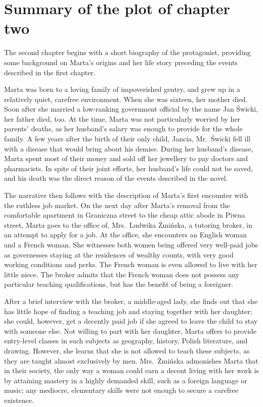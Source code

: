 \section{Summary of the plot of chapter two}

The second chapter begins with a short biography of the protagonist, providing some background on Marta's origins and her life story preceding the events described in the first chapter.

Marta was born to a loving family of impoverished gentry, and grew up in a relatively quiet, carefree environment.
When she was sixteen, her mother died.
Soon after she married a low-ranking government official by the name Jan Świcki, her father died, too.
At the time, Marta was not particularly worried by her parents' deaths, as her husband's salary was enough to provide for the whole family.
A few years after the birth of their only child, Jancia, Mr.\ Świcki fell ill with a disease that would bring about his demise.
During her husband's disease, Marta spent most of their money and sold off her jewellery to pay doctors and pharmacists.
In spite of their joint efforts, her husband's life could not be saved, and his death was the direct reason of the events described in the novel.

The narrative then follows with the description of Marta's first encounter with the ruthless job market.
On the next day after Marta's removal from the comfortable apartment in Graniczna street to the cheap attic abode in Piwna street, Marta goes to the office of, Mrs.\ Ludwika Żmińska, a tutoring broker, in an attempt to apply for a job.
At the office, she encounters an English woman and a French woman.
She witnesses both women being offered very well-paid jobs as governesses staying at the residences of wealthy counts, with very good working conditions and perks.
The French woman is even allowed to live with her little niece.
The broker admits that the French woman does not possess any particular teaching qualifications, but has the benefit of being a foreigner.

After a brief interview with the broker, a middle-aged lady, she finds out that she has little hope of finding a teaching job and staying together with her daughter; she could, however, get a decently paid job if she agreed to leave the child to stay with someone else.
Not willing to part with her daughter, Marta offers to provide entry-level classes in such subjects as geography, history, Polish literature, and drawing.
However, she learns that she is not allowed to teach these subjects, as they are taught almost exclusively by men.
Mrs.\ Żmińska admonishes Marta that in their society, the only way a woman could earn a decent living with her work is by attaining mastery in a highly demanded skill, such as a foreign language or music; any mediocre, elementary skills were not enough to secure a carefree existence.

